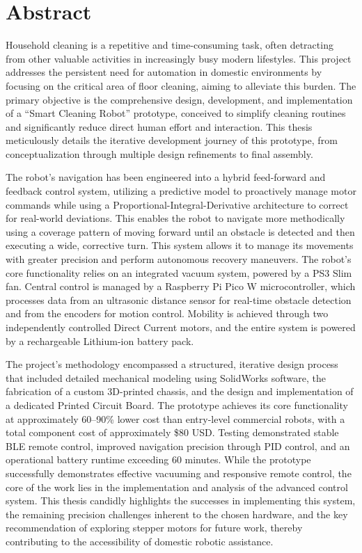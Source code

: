 \chapter*{Abstract}
Household cleaning is a repetitive and time-consuming task, often detracting from other valuable activities in increasingly busy modern lifestyles. This project addresses the persistent need for automation in domestic environments by focusing on the critical area of floor cleaning, aiming to alleviate this burden. The primary objective is the comprehensive design, development, and implementation of a ``Smart Cleaning Robot'' prototype, conceived to simplify cleaning routines and significantly reduce direct human effort and interaction. This thesis meticulously details the iterative development journey of this prototype, from conceptualization through multiple design refinements to final assembly.

The robot's navigation has been engineered into a hybrid feed-forward and feedback control system, utilizing a predictive model to proactively manage motor commands while using a Proportional-Integral-Derivative architecture to correct for real-world deviations. This enables the robot to navigate more methodically using a coverage pattern of moving forward until an obstacle is detected and then executing a wide, corrective turn. This system allows it to manage its movements with greater precision and perform autonomous recovery maneuvers. The robot's core functionality relies on an integrated vacuum system, powered by a PS3 Slim fan. Central control is managed by a Raspberry Pi Pico W microcontroller, which processes data from an ultrasonic distance sensor for real-time obstacle detection and from the encoders for motion control. Mobility is achieved through two independently controlled Direct Current motors, and the entire system is powered by a rechargeable Lithium-ion battery pack.

The project's methodology encompassed a structured, iterative design process that included detailed mechanical modeling using SolidWorks software, the fabrication of a custom 3D-printed chassis, and the design and implementation of a dedicated Printed Circuit Board. The prototype achieves its core functionality at approximately 60--90\% lower cost than entry-level commercial robots, with a total component cost of approximately \$80 USD. Testing demonstrated stable BLE remote control, improved navigation precision through PID control, and an operational battery runtime exceeding 60 minutes. While the prototype successfully demonstrates effective vacuuming and responsive remote control, the core of the work lies in the implementation and analysis of the advanced control system. This thesis candidly highlights the successes in implementing this system, the remaining precision challenges inherent to the chosen hardware, and the key recommendation of exploring stepper motors for future work, thereby contributing to the accessibility of domestic robotic assistance.
\clearpage %

